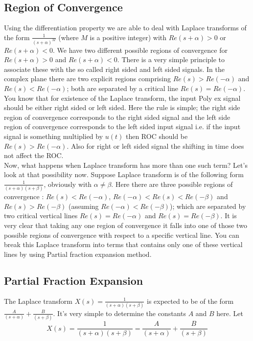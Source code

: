 \subsection{Region of Convergence}
Using the differentiation property we are able to deal with Laplace transforms of the form $\frac{1}{(s+\alpha)^M}$  (where $M$ is a positive integer) with $Re(s+\alpha) > 0$ or $Re(s+\alpha) < 0$. We have two different possible regions of convergence for $Re(s+\alpha) > 0$ and  $Re(s+\alpha) < 0$. There is a very simple principle to associate these with the so called right sided and left sided signals. In the complex plane there are two explicit regions comprising $Re(s) > Re(-\alpha)$ and $Re(s) < Re(-\alpha)$; both are separated by a critical line $Re(s) = Re(- \alpha)$. You know that for existence of the Laplace transform, the input Poly ex signal should be either right sided or left sided. Here the rule is simple; the right side region of convergence corresponds to the right sided signal and the left side region of convergence corresponds to the left sided input signal i.e. if the input signal is something multiplied by $u(t)$ then ROC should be $Re(s) > Re(-\alpha)$. Also for right or left sided signal the shifting in time does not affect the ROC.\\
Now, what happens when Laplace transform has more than one such term? Let's look at that possibility now. Suppose Laplace transform is of the following form $\frac{1}{(s+\alpha)(s+\beta)}$,  obviously with $\alpha \neq  \beta$. Here there are three possible regions of convergence : $Re(s) < Re(-\alpha)$, $Re(-\alpha) < Re(s) < Re(-\beta)$ and $Re(s) > Re(-\beta)$ (assuming $Re(-\alpha) < Re(-\beta)$); which are separated by two critical vertical lines  $Re(s) = Re(- \alpha)$ and $Re(s) = Re(-\beta)$. It is very clear that taking any one region of convergence it falls into one of those two possible regions of convergence with respect to a specific vertical line. You can break this Laplace transform into terms that contains only one of these vertical lines by using Partial fraction expansion method.

\subsection{Partial Fraction Expansion}
The Laplace transform $X(s) = \frac{1}{(s+\alpha)(s+\beta)}$ is expected to be of the form $\frac{A}{(s+\alpha)} + \frac{B}{(s+\beta)}$. It’s very simple to determine the constants $A$ and $B$ here. Let
\[
X(s) = \frac{1}{(s+\alpha)(s+\beta)} = \frac{A}{(s+\alpha)} + \frac{B}{(s+\beta)}
\]

